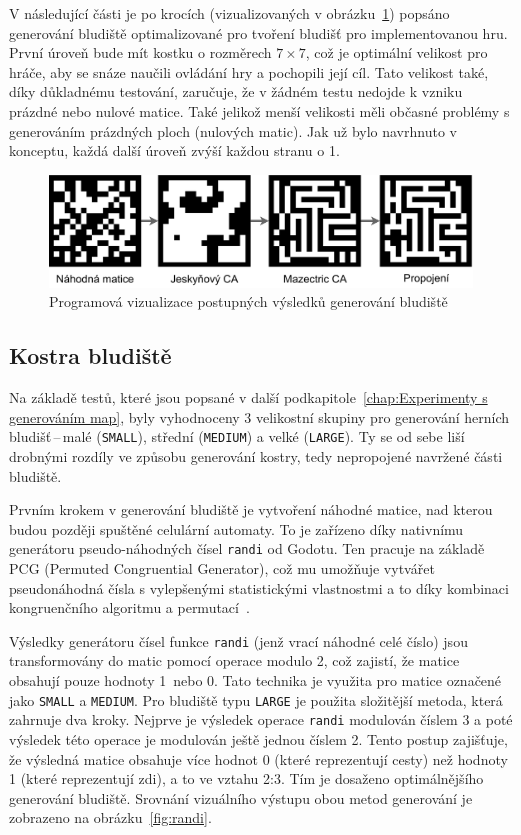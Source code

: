 V následující části je po krocích (vizualizovaných v obrázku~\ref{fig:visualisation_generating}) popsáno generování bludiště optimalizované pro tvoření bludišť pro implementovanou hru. První úroveň bude mít kostku o rozměrech $7 \times 7$, což je optimální velikost pro hráče, aby se snáze naučili ovládání hry a pochopili její cíl. Tato velikost také, díky důkladnému testování, zaručuje, že v žádném testu nedojde k vzniku prázdné nebo nulové matice. Také jelikož menší velikosti měli občasné problémy s generováním prázdných ploch (nulových matic). Jak už bylo navrhnuto v konceptu, každá další úroveň zvýší každou stranu o 1.

\vspace{0.5cm}
\begin{figure}[b]
    \centering
    \includegraphics[width=\textwidth]{obrazky-figures/ch4/visualisation_generating.pdf}
    \caption{Programová vizualizace postupných výsledků generování bludiště}
    \label{fig:visualisation_generating}
\end{figure}

\subsection*{Kostra bludiště}
Na základě testů, které jsou popsané v další podkapitole~\ref{chap:Experimenty s generováním map}, byly vyhodnoceny 3 velikostní skupiny pro generování herních bludišť\,--\,malé (\verb|SMALL|), střední (\verb|MEDIUM|) a velké (\verb|LARGE|). Ty se od sebe liší drobnými rozdíly ve způsobu generování kostry, tedy nepropojené navržené části bludiště.

Prvním krokem v generování bludiště je vytvoření náhodné matice, nad kterou budou později spuštěné celulární automaty. To je zařízeno díky nativnímu generátoru pseudo-náhodných čísel \verb|randi| od Godotu. Ten pracuje na základě PCG (Permuted Congruential Generator), což mu umožňuje vytvářet pseudonáhodná čísla s vylepšenými statistickými vlastnostmi a to díky kombinaci kongruenčního algoritmu a permutací~\cite{PCG}. 

Výsledky generátoru čísel funkce \verb|randi| (jenž vrací náhodné celé číslo) jsou transformovány do matic pomocí operace modulo 2, což zajistí, že matice obsahují pouze hodnoty 1~nebo 0. Tato technika je využita pro matice označené jako \verb|SMALL| a \verb|MEDIUM|. Pro bludiště typu \verb|LARGE| je použita složitější metoda, která zahrnuje dva kroky. Nejprve je výsledek operace \verb|randi| modulován číslem 3 a poté výsledek této operace je modulován ještě jednou číslem 2. Tento postup zajišťuje, že výsledná matice obsahuje více hodnot 0 (které reprezentují cesty) než hodnoty 1 (které reprezentují zdi), a to ve vztahu 2:3. Tím je dosaženo optimálnějšího generování bludiště. Srovnání vizuálního výstupu obou metod generování je zobrazeno na obrázku~\ref{fig:randi}.

